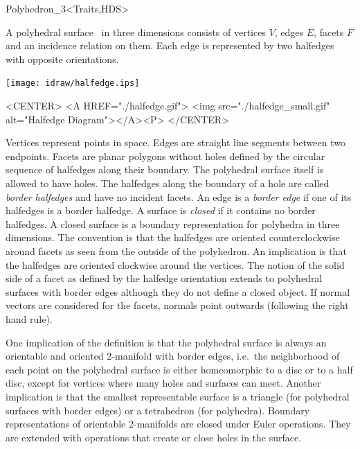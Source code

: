 \begin{ccClassTemplate}{Polyhedron_3<Traits,HDS>}
\label{sectionPolyhedron}

\ccDefinition  



A polyhedral surface \ccClassTemplateName\ in three dimensions
consists of vertices $V$, edges $E$, facets $F$ and an incidence
relation on them.  Each edge is represented by two halfedges with
opposite orientations.

\begin{ccTexOnly}
    \vspace{-7mm}
    \begin{center}
      \parbox{0.4\textwidth}{%
          \texttt{[image: idraw/halfedge.ips]}%
      }
    \end{center}
    \vspace{-5mm}
\end{ccTexOnly}

\begin{ccHtmlOnly}
    <CENTER>
    <A HREF="./halfedge.gif">
        <img src="./halfedge_small.gif" alt="Halfedge Diagram"></A><P>
    </CENTER>
\end{ccHtmlOnly}

Vertices represent points in space. Edges are straight line segments
between two endpoints. Facets are planar polygons without holes
defined by the circular sequence of halfedges along their boundary.
The polyhedral surface itself is allowed to have holes. The halfedges
along the boundary of a hole are called {\em border halfedges\/} and
have no incident facets. An edge is a {\em border edge\/} if one of
its halfedges is a border halfedge.  A surface is {\em closed\/} if it
contains no border halfedges. A closed surface is a boundary
representation for polyhedra in three dimensions. The convention is
that the halfedges are oriented counterclockwise around facets as seen
from the outside of the polyhedron. An implication is that the
halfedges are oriented clockwise around the vertices. The notion of
the solid side of a facet as defined by the halfedge orientation
extends to polyhedral surfaces with border edges although they do not
define a closed object. If normal vectors are considered for the
facets, normals point outwards (following the right hand rule).

One implication of the definition is that the polyhedral surface is
always an orientable and oriented 2-manifold with border edges,
i.e.~the neighborhood of each point on the polyhedral surface is
either homeomorphic to a disc or to a half disc, except for vertices
where many holes and surfaces can meet. Another implication is that
the smallest representable surface is a triangle (for polyhedral
surfaces with border edges) or a tetrahedron (for polyhedra). Boundary
representations of orientable 2-manifolds are closed under Euler
operations. They are extended with operations that create or close
holes in the surface.


\end{ccClassTemplate}

